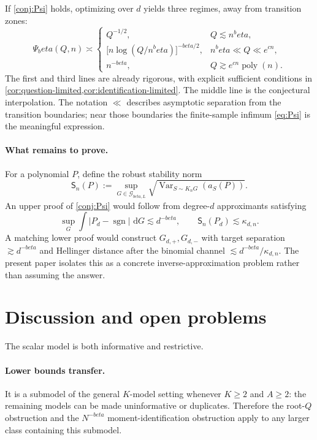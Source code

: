 \documentclass[11pt]{article}
\def\beta{beta}%
\newcommand{\sgn}{\operatorname{sgn}}
\newcommand{\Var}{\operatorname{Var}}
\newcommand{\calG}{\mathcal G}
\newcommand{\dd}{\,\mathrm d}
\begin{document}
If \cref{conj:Psi} holds, optimizing over $d$ yields three regimes, away from transition zones:
\begin{equation}
\label{eq:three-phase}
\Psi_\beta(Q,n)
\asymp
\begin{cases}
Q^{-1/2},
&Q\lesssim n^\beta,\\[1.2ex]
\bigl[n\log(Q/n^\beta)\bigr]^{-\beta/2},
&n^\beta\ll Q\ll e^{cn},\\[1.2ex]
n^{-\beta},
&Q\gtrsim e^{cn}\operatorname{poly}(n).
\end{cases}
\end{equation}
The first and third lines are already rigorous, with explicit sufficient conditions in \cref{cor:question-limited,cor:identification-limited}.  The middle line is the conjectural interpolation.  The notation $\ll$ describes asymptotic separation from the transition boundaries; near those boundaries the finite-sample infimum \eqref{eq:Psi} is the meaningful expression.

\paragraph{What remains to prove.}
For a polynomial $P$, define the robust stability norm
\[
\mathsf S_n(P)
:=
\sup_{G\in\calG_{\beta,L}}
\sqrt{\Var_{S\sim K_nG}(a_S(P))}.
\]
An upper proof of \cref{conj:Psi} would follow from degree-$d$ approximants satisfying
\[
\sup_G\int|P_d-\sgn|\,\dd G\lesssim d^{-\beta},
\qquad
\mathsf S_n(P_d)\lesssim\kappa_{d,n}.
\]
A matching lower proof would construct $G_{d,+},G_{d,-}$ with target separation $\gtrsim d^{-\beta}$ and Hellinger distance after the binomial channel $\lesssim d^{-\beta}/\kappa_{d,n}$.  The present paper isolates this as a concrete inverse-approximation problem rather than assuming the answer.

\section{Discussion and open problems}
\label{sec:back-general}

The scalar model is both informative and restrictive.

\paragraph{Lower bounds transfer.}
It is a submodel of the general $K$-model setting whenever $K\ge2$ and $A\ge2$: the remaining models can be made uninformative or duplicates.  Therefore the root-$Q$ obstruction and the $N^{-\beta}$ moment-identification obstruction apply to any larger class containing this submodel.
\end{document}
